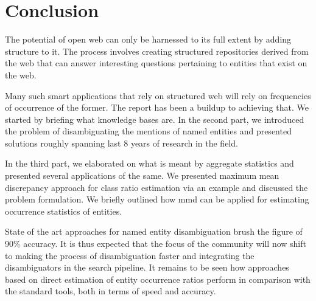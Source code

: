 \chapter{Conclusion}
The potential of open web can only be harnessed to its full extent by adding structure to it. The process involves 
creating structured repositories derived from the web that can answer interesting questions pertaining to entities
that exist on the web. 

Many such smart applications that rely on structured web will rely on frequencies of occurrence of the former. 
The report has been a buildup to achieving that.
We started by briefing what knowledge bases are. In the second part, we introduced the problem of disambiguating the
mentions of named entities and presented solutions roughly spanning last 8 years of research in the field. 

In the third part, we elaborated on what is meant by aggregate statistics and presented several applications of the same. 
We presented maximum mean discrepancy approach for class ratio estimation via an example and discussed the problem formulation. We briefly outlined how mmd can be applied for
 estimating occurrence statistics of entities.

State of the art approaches for named entity disambiguation brush the figure of 90\% accuracy. It is thus expected
that the focus of the community will now shift to making the process of disambiguation faster and integrating the 
disambiguators in the search pipeline. It remains to be seen how approaches based on direct estimation of entity occurrence 
ratios perform in comparison with the standard tools, both in terms of speed and accuracy. 